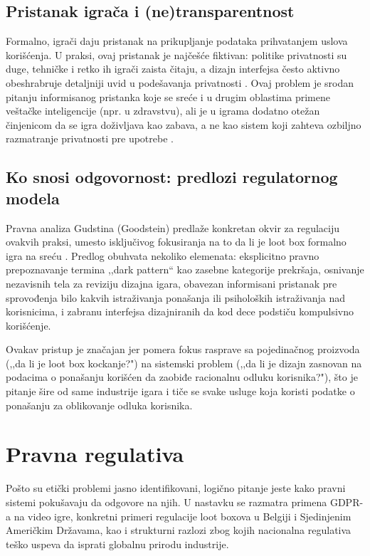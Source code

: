 \documentclass[12pt]{article}
\begin{document}
\subsection{Pristanak igrača i (ne)transparentnost}

Formalno, igrači daju pristanak na prikupljanje podataka prihvatanjem uslova korišćenja. U praksi, ovaj pristanak je najčešće fiktivan: politike privatnosti su duge, tehničke i retko ih igrači zaista čitaju, a dizajn interfejsa često aktivno obeshrabruje detaljniji uvid u podešavanja privatnosti \cite{bourdoucen2023}. Ovaj problem je srodan pitanju informisanog pristanka koje se sreće i u drugim oblastima primene veštačke inteligencije (npr. u zdravstvu), ali je u igrama dodatno otežan činjenicom da se igra doživljava kao zabava, a ne kao sistem koji zahteva ozbiljno razmatranje privatnosti pre upotrebe \cite{kroger2023}.
\subsection{Ko snosi odgovornost: predlozi regulatornog modela}

Pravna analiza Gudstina (Goodstein) predlaže konkretan okvir za regulaciju ovakvih praksi, umesto isključivog fokusiranja na to da li je loot box formalno igra na sreću \cite{goodstein2021}. Predlog obuhvata nekoliko elemenata: eksplicitno pravno prepoznavanje termina ,,dark pattern`` kao zasebne kategorije prekršaja, osnivanje nezavisnih tela za reviziju dizajna igara, obavezan informisani pristanak pre sprovođenja bilo kakvih istraživanja ponašanja ili psiholoških istraživanja nad korisnicima, i zabranu interfejsa dizajniranih da kod dece podstiču kompulsivno korišćenje.

Ovakav pristup je značajan jer pomera fokus rasprave sa pojedinačnog proizvoda (,,da li je loot box kockanje?") na sistemski problem (,,da li je dizajn zasnovan na podacima o ponašanju korišćen da zaobiđe racionalnu odluku korisnika?"), što je pitanje šire od same industrije igara i tiče se svake usluge koja koristi podatke o ponašanju za oblikovanje odluka korisnika.

\section{Pravna regulativa}\label{sec:pravna}

Pošto su etički problemi jasno identifikovani, logično pitanje jeste kako pravni sistemi pokušavaju da odgovore na njih. U nastavku se razmatra primena GDPR-a na video igre, konkretni primeri regulacije loot boxova u Belgiji i Sjedinjenim Američkim Državama, kao i strukturni razlozi zbog kojih nacionalna regulativa teško uspeva da isprati globalnu prirodu industrije.
\end{document}
